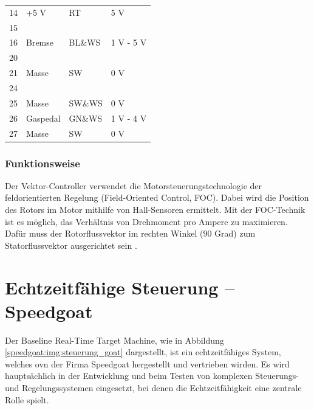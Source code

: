 \begin{table}[!ht]
\begin{tabular}{lll|l}
		\multicolumn{1}{l|}{14}      & +5 V                    & RT             & 5 V             \\
		\multicolumn{1}{l|}{15}      &                         &                &                 \\
		\multicolumn{1}{l|}{16}      & Bremse                  & BL\&WS         & 1 V - 5 V       \\
		\multicolumn{1}{l|}{20}      &                         &                &                 \\
		\multicolumn{1}{l|}{21}      & Masse                   & SW             & 0 V             \\
		\multicolumn{1}{l|}{24}      &                         &                &                 \\
		\multicolumn{1}{l|}{25}      & Masse                   & SW\&WS         & 0 V             \\
		\multicolumn{1}{l|}{26}      & Gaspedal                & GN\&WS         & 1 V - 4 V       \\
		\multicolumn{1}{l|}{27}      & Masse                   & SW             & 0 V             \\ \hline
	\end{tabular}
\end{table}
\pagebreak[4]

\subsubsection{Funktionsweise}
\label{Vector_Controller:Funktionsweise}
Der Vektor-Controller verwendet die Motorsteuerungstechnologie der feldorientierten Regelung (Field-Oriented Control, FOC). Dabei wird die Position des Rotors im Motor mithilfe von Hall-Sensoren ermittelt. Mit der FOC-Technik ist es möglich, das Verhältnis von Drehmoment pro Ampere zu maximieren. Dafür muss der Rotorflussvektor im rechten Winkel (90 Grad) zum Statorflussvektor ausgerichtet sein \cite{Golden_Motor:Vector_Controller}.


\newpage


\section{Echtzeitfähige Steuerung – Speedgoat}
\label{section:speedgoat}


Der Baseline Real-Time Target Machine, wie in Abbildung \ref{speedgoat:img:steuerung_goat} dargestellt, ist ein echtzeitfähiges System, welches ovn der Firma Speedgoat hergestellt und vertrieben wirden. Es wird hauptsächlich in der Entwicklung und beim Testen von komplexen Steuerungs- und Regelungssystemen eingesetzt, bei denen die Echtzeitfähigkeit eine zentrale Rolle spielt.\\ \ \\



